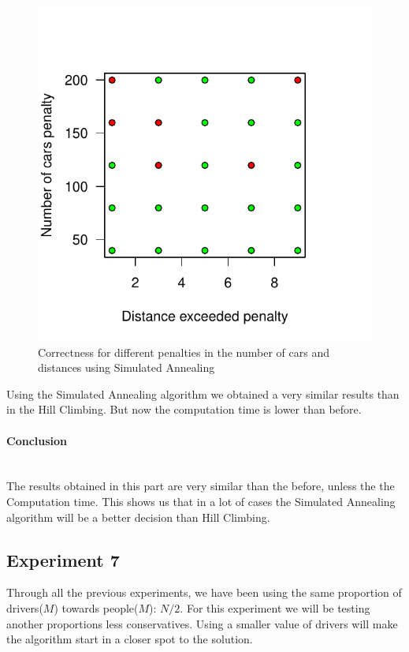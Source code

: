 \documentclass[12]{article}
\begin{document}
\begin{figure}[H]
  \captionsetup{justification=centering}
   \centering
    \includegraphics[scale=0.8]{Results/data_6_4.pdf}
      \caption{Correctness for different penalties in the number of cars and distances using Simulated Annealing}
      \label{fig:data_6_4}
  \end{figure}
    \vspace{1cm}
    
Using the Simulated Annealing algorithm we obtained a very similar results than in the Hill Climbing. But now the computation time is lower than before. 

\paragraph{Conclusion}\mbox{}\\

The results obtained in this part are very similar than the before, unless the the Computation time. This shows us that in a lot of cases the Simulated Annealing algorithm will be a better decision than Hill Climbing.

\subsection{Experiment 7}
Through all the previous experiments, we have been using the same proportion of drivers($M$) towards people($M$): $N/2$. For this experiment we will be testing another proportions less conservatives. Using a smaller value of drivers will make the algorithm start in a closer spot to the solution.
\end{document}
